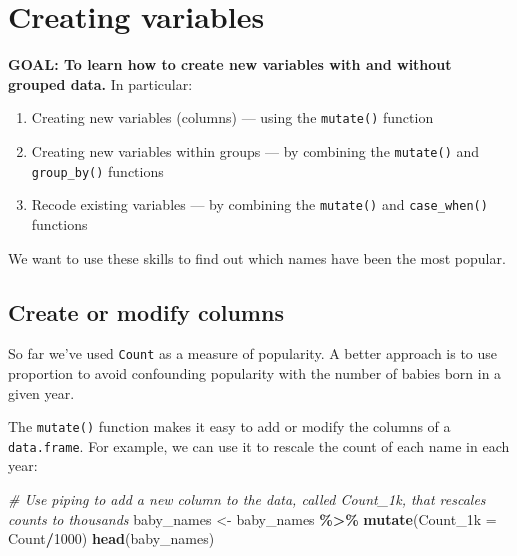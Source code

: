 \documentclass[
]{book}
\newenvironment{Shaded}{\begin{snugshade}}{\end{snugshade}}
\newcommand{\CommentTok}[1]{\textcolor[rgb]{0.56,0.35,0.01}{\textit{#1}}}
\newcommand{\DataTypeTok}[1]{\textcolor[rgb]{0.13,0.29,0.53}{#1}}
\newcommand{\DecValTok}[1]{\textcolor[rgb]{0.00,0.00,0.81}{#1}}
\newcommand{\KeywordTok}[1]{\textcolor[rgb]{0.13,0.29,0.53}{\textbf{#1}}}
\newcommand{\NormalTok}[1]{#1}
\newcommand{\OperatorTok}[1]{\textcolor[rgb]{0.81,0.36,0.00}{\textbf{#1}}}
\newcommand{\StringTok}[1]{\textcolor[rgb]{0.31,0.60,0.02}{#1}}
\providecommand{\tightlist}{%
  \setlength{\itemsep}{0pt}\setlength{\parskip}{0pt}}
\begin{document}
\hypertarget{creating-variables}{%
\section{Creating variables}\label{creating-variables}}

\begin{alert}

\textbf{GOAL: To learn how to create new variables with and without grouped data.} In particular:

\begin{enumerate}
\def\labelenumi{\arabic{enumi}.}
\tightlist
\item
  Creating new variables (columns) --- using the \texttt{mutate()} function
\item
  Creating new variables within groups --- by combining the \texttt{mutate()} and \texttt{group\_by()} functions
\item
  Recode existing variables --- by combining the \texttt{mutate()} and \texttt{case\_when()} functions
\end{enumerate}

\end{alert}

We want to use these skills to find out which names have been the most popular.

\hypertarget{create-or-modify-columns}{%
\subsection{Create or modify columns}\label{create-or-modify-columns}}

So far we've used \texttt{Count} as a measure of popularity. A better
approach is to use proportion to avoid confounding
popularity with the number of babies born in a given year.

The \texttt{mutate()} function makes it easy to add or modify the columns
of a \texttt{data.frame}. For example, we can use it to rescale the count
of each name in each year:

\begin{Shaded}
\begin{Highlighting}[]
\CommentTok{\# Use piping to add a new column to the data, called Count\_1k, that rescales counts to thousands}
\NormalTok{baby\_names \textless{}{-}}\StringTok{ }\NormalTok{baby\_names }\OperatorTok{\%\textgreater{}\%}\StringTok{ }\KeywordTok{mutate}\NormalTok{(}\DataTypeTok{Count\_1k =}\NormalTok{ Count}\OperatorTok{/}\DecValTok{1000}\NormalTok{)}
\KeywordTok{head}\NormalTok{(baby\_names) }
\end{Highlighting}
\end{Shaded}
\end{document}
